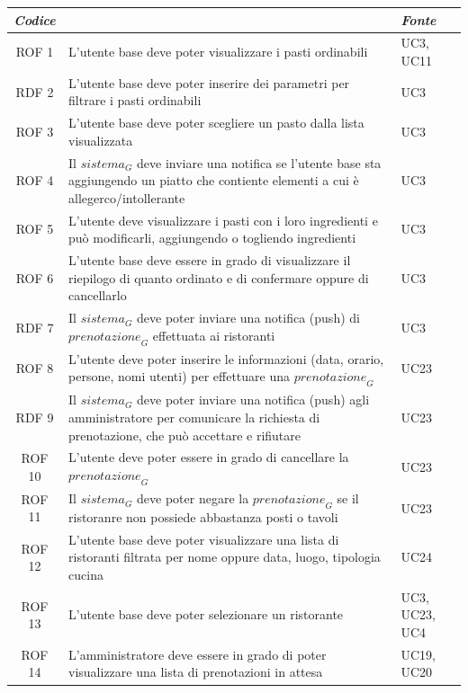 \documentclass[12pt, oneside]{article}
\begin{document}
\begin{longtable}{|c|p{14cm}|p{2cm}|}
    \hline
    \emph{Codice} & \centering{\emph{Descrizione}} &  \emph{Fonte} \\
    \hline
    \endfirsthead
    \endhead
    ROF 1 & L'utente base deve poter visualizzare i pasti ordinabili & UC3, UC11\\
    \hline
    RDF 2 & L'utente base deve poter inserire dei parametri per filtrare i pasti ordinabili  & UC3 \\
    \hline
    ROF 3 & L'utente base deve poter scegliere un pasto dalla lista visualizzata & UC3 \\
    \hline
    ROF 4 & Il $\textit{sistema}_G$ deve inviare una notifica se l'utente base sta aggiungendo un piatto che contiente elementi a cui è allegerco/intollerante & UC3\\
    \hline
    ROF 5 & L'utente deve visualizzare i pasti con i loro ingredienti e può modificarli, aggiungendo o togliendo ingredienti & UC3\\
    \hline
    ROF 6 & L'utente base deve essere in grado di visualizzare il riepilogo di quanto ordinato e di confermare oppure di cancellarlo & UC3 \\
    \hline
    RDF 7 & Il $\textit{sistema}_G$ deve poter inviare una notifica (push) di $\textit{prenotazione}_G$ effettuata ai ristoranti& UC3 \\
    \hline
    ROF 8 & L'utente deve poter inserire le informazioni (data, orario, persone, nomi utenti) per effettuare una $\textit{prenotazione}_G$ & UC23\\
    \hline
    RDF 9 & Il $\textit{sistema}_G$ deve poter inviare una notifica (push) agli amministratore per comunicare la richiesta di prenotazione, che può accettare e rifiutare & UC23\\
    \hline
    ROF 10 & L'utente deve poter essere in grado di cancellare la $\textit{prenotazione}_G$ & UC23 \\
    \hline
    ROF 11 & Il $\textit{sistema}_G$ deve poter negare la $\textit{prenotazione}_G$ se il ristoranre non possiede abbastanza posti o tavoli & UC23 \\
    \hline
    ROF 12 & L'utente base deve poter visualizzare una lista di ristoranti filtrata per nome oppure data, luogo, tipologia cucina & UC24 \\
    \hline
    ROF 13 & L'utente base deve poter selezionare un ristorante  & UC3, UC23, UC4\\
    \hline
    ROF 14 & L'amministratore deve essere in grado di poter visualizzare una lista di prenotazioni in attesa & UC19, UC20 \\

\end{longtable}
\end{document}
